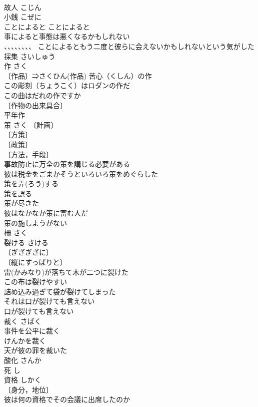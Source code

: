 \documentclass[8pt]{extreport}
\begin{document}
\begin{CJK}{UTF8}{min}
\\	故人	こじん	
\\	小銭	こぜに	
\\	ことによると	ことによると	
\\	事によると事態は悪くなるかもしれない 
\\	、、、、、、、、 ことによるともう二度と彼らに会えないかもしれないという気がした 
\\	採集	さいしゅう	
\\	作	さく	
\\	〔作品〕⇒さくひん(作品) 苦心（くしん）の作 
\\	この彫刻（ちょうこく）はロダンの作だ 
\\	この曲はだれの作ですか 
\\	〔作物の出来具合〕
\\	平年作 
\\	策	さく	〔計画〕
\\	〔方策〕
\\	〔政策〕
\\	〔方法，手段〕
\\	事故防止に万全の策を講じる必要がある 
\\	彼は税金をごまかそうといろいろ策をめぐらした 
\\	策を弄(ろう)する 
\\	策を誤る 
\\	策が尽きた 
\\	彼はなかなか策に富む人だ 
\\	策の施しようがない 
\\	柵	さく	
\\	裂ける	さける	
\\	〔ぎざぎざに〕
\\	〔縦にすっぱりと〕
\\	雷(かみなり)が落ちて木が二つに裂けた 
\\	この布は裂けやすい 
\\	詰め込み過ぎて袋が裂けてしまった 
\\	それは口が裂けても言えない 
\\	口が裂けても言えない 
\\	裁く	さばく	
\\	事件を公平に裁く 
\\	けんかを裁く 
\\	天が彼の罪を裁いた 
\\	酸化	さんか	
\\	死	し	
\\	資格	しかく	
\\	〔身分，地位〕
\\	彼は何の資格でその会議に出席したのか 

\end{CJK}
\end{document}
